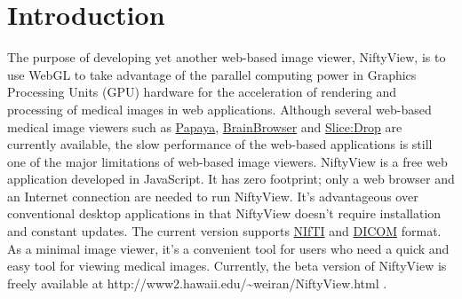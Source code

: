 \documentclass[twocolumn]{bmcart}%
\begin{document}
\begin{frontmatter}
\begin{fmbox}

	








%
\end{fmbox}%

\end{frontmatter}


\section{Introduction}\label{introduction}

The purpose of developing yet another web-based image viewer, NiftyView,
is to use WebGL to take advantage of the parallel computing power in
Graphics Processing Units (GPU) hardware for the acceleration of
rendering and processing of medical images in web applications. Although
several web-based medical image viewers such as
\href{https://github.com/rii-mango/Papaya}{Papaya},
\href{https://brainbrowser.cbrain.mcgill.ca}{BrainBrowser} and
\href{http://slicedrop.com}{Slice:Drop} are currently available, the
slow performance of the web-based applications is still one of the major
limitations of web-based image viewers. NiftyView is a free web
application developed in JavaScript. It has zero footprint; only a web
browser and an Internet connection are needed to run NiftyView. It's
advantageous over conventional desktop applications in that NiftyView
doesn't require installation and constant updates. The current version
supports \href{http://nifti.nimh.nih.gov}{NIfTI} and
\href{http://dicom.nema.org}{DICOM} format. As a minimal image viewer,
it's a convenient tool for users who need a quick and easy tool for
viewing medical images. Currently, the beta version of NiftyView is
freely available at
http://www2.hawaii.edu/\textasciitilde{}weiran/NiftyView.html .
\end{document}
